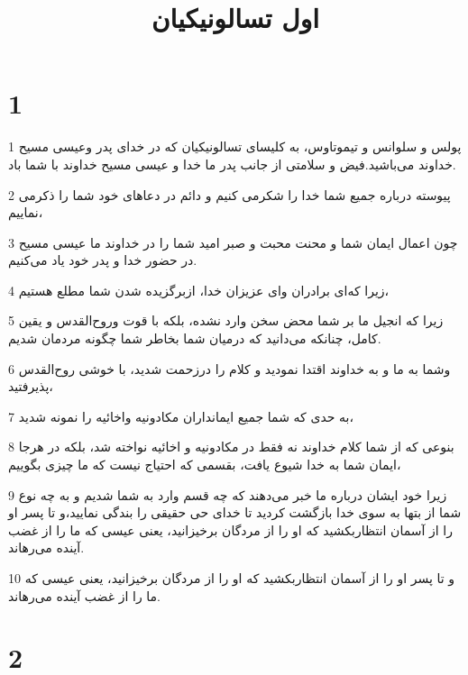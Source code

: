 

\title{اول تسالونيکيان}


\chapter{1}

\par 1 پولس و سلوانس و تیموتاوس، به کلیسای تسالونیکیان که در خدای پدر وعیسی مسیح خداوند می‌باشید.فیض و سلامتی از جانب پدر ما خدا و عیسی مسیح خداوند با شما باد.
\par 2 پیوسته درباره جمیع شما خدا را شکرمی کنیم و دائم در دعاهای خود شما را ذکرمی نماییم،
\par 3 چون اعمال ایمان شما و محنت محبت و صبر امید شما را در خداوند ما عیسی مسیح در حضور خدا و پدر خود یاد می‌کنیم.
\par 4 زیرا که‌ای برادران و‌ای عزیزان خدا، ازبرگزیده شدن شما مطلع هستیم،
\par 5 زیرا که انجیل ما بر شما محض سخن وارد نشده، بلکه با قوت وروح‌القدس و یقین کامل، چنانکه می‌دانید که درمیان شما بخاطر شما چگونه مردمان شدیم.
\par 6 وشما به ما و به خداوند اقتدا نمودید و کلام را درزحمت شدید، با خوشی روح‌القدس پذیرفتید،
\par 7 به حدی که شما جمیع ایمانداران مکادونیه واخائیه را نمونه شدید،
\par 8 بنوعی که از شما کلام خداوند نه فقط در مکادونیه و اخائیه نواخته شد، بلکه در هرجا ایمان شما به خدا شیوع یافت، بقسمی که احتیاج نیست که ما چیزی بگوییم،
\par 9 زیرا خود ایشان درباره ما خبر می‌دهند که چه قسم وارد به شما شدیم و به چه نوع شما از بتها به سوی خدا بازگشت کردید تا خدای حی حقیقی را بندگی نمایید،و تا پسر او را از آسمان انتظاربکشید که او را از مردگان برخیزانید، یعنی عیسی که ما را از غضب آینده می‌رهاند.
\par 10 و تا پسر او را از آسمان انتظاربکشید که او را از مردگان برخیزانید، یعنی عیسی که ما را از غضب آینده می‌رهاند.

\chapter{2}

